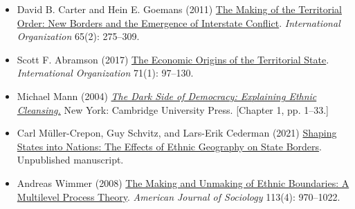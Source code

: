 \documentclass[12pt, a4paper]{article}
\begin{document}
\begin{itemize}
	\item David B. Carter and Hein E. Goemans (2011) \href{https://doi.org/10.1017/S0020818311000051}{The Making of the Territorial Order: New Borders and the Emergence of Interstate Conflict}. \textit{International Organization} 65(2): 275--309.
	\item Scott F. Abramson (2017) \href{https://doi.org/10.1017/S0020818316000308}{The Economic Origins of the Territorial State}. \textit{International Organization} 71(1): 97--130.
	\item Michael Mann (2004) \href{https://www.cambridge.org/core/books/dark-side-of-democracy/7E75A132A188A2804E91F4F209B6FE1F}{\textit{The Dark Side of Democracy: Explaining Ethnic Cleansing.}} New York: Cambridge University Press. [Chapter 1, pp. 1--33.]
	\item Carl Müller-Crepon, Guy Schvitz, and Lars-Erik Cederman (2021) \href{http://www.carlmueller-crepon.org/publication/state_shape/}{Shaping States into Nations: The Effects of Ethnic Geography on State Borders}. Unpublished manuscript.
	\item Andreas Wimmer (2008) \href{https://doi.org/10.1086/522803}{The Making and Unmaking of Ethnic Boundaries: A Multilevel Process Theory}. \textit{American Journal of Sociology} 113(4): 970--1022.
\end{itemize}

%
\end{document}
